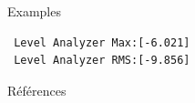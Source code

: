 \documentclass[final, hyperref, table]{beamer}
\begin{document}
\begin{frame}[containsverbatim]{}
\begin{columns}[t]
\begin{column}[T]{.49\linewidth}
\begin{block}{Examples}
\begin{minipage}{0.32\linewidth}
\begin{lstlisting}
 Level Analyzer Max:[-6.021] 
 Level Analyzer RMS:[-9.856]

\end{lstlisting}


\end{minipage}

  \end{block}
\begin{block}{Références}\tiny

\vspace{-1cm}
\begin{multicols}{2}[]

\end{multicols}
  \end{block}
 \end{column}
\end{columns}
\end{frame}
\end{document}
